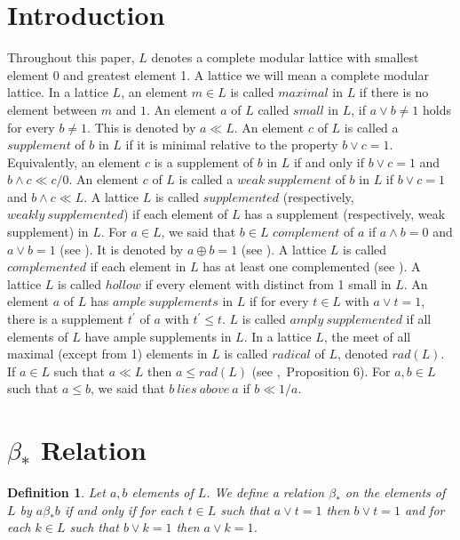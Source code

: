 \documentclass[a4paper,12pt]{article}
\newtheorem{definition}[theorem]{Definition}
\numberwithin{equation}{section}
\newcommand{\mycite}[2]{\textnormal{\cite{#1},~#2}}
\begin{document}
\section{Introduction}
Throughout this paper, $ L $ denotes a complete modular lattice with smallest element 0 and 
greatest element 1. A lattice we will mean a complete modular lattice. In a lattice $ L $, an element $ m \in L $ is called $ maximal $ in $ L $ if there is no element between $ m $ and $ 1 $. An element $ a $ of $ L $ 
called $ small $ in $ L $, if $ a \vee b \neq 1 $ holds for every $ b \neq 1 $. This is denoted by $ a \ll L $. An element $ c $ of $ L $ is called a $ supplement $ of $ b $ in $ L $ 
if it is minimal relative to the property $ b \vee c = 1 $. Equivalently, an element $ c $ is a supplement of $ b $ in $ L $ if and only if $ b \vee c = 1 $ and 
$ b \wedge c \ll c/0 $. An element $ c $ of $ L $ is called a $ weak \ supplement $ of $ b $ in $ L $ if $ b \vee c = 1 $ and $ b \wedge c \ll L $. A lattice $ L $ is called 
$ supplemented $ (respectively, $ weakly \ supplemented $) if each element of $ L $ has a supplement (respectively, weak supplement) in $ L $.
For $ a \in L $, we said that $ b \in L $ $ complement $ of $ a $ if $ a \wedge b = 0 $ and $ a \vee b = 1 $ (see \cite{davey}). It is denoted by $ a \oplus b = 1 $ (see \cite{calugeranu}). 
A lattice $ L $ is called $ complemented $ if each element in $ L $ has at least one complemented (see \cite{calugeranu}). A lattice $ L $ is called $ hollow $ if every element with distinct from 
1 small in $ L $. An element $ a $ of $ L $ has $ ample \  supplements $ in $ L $ if for every $ t \in L $ with  $ a \vee t = 1 $, there is a supplement $ t^{'} $ of $ a $ with $ t^{'} \leq t $. 
$ L $ is called $ amply \ supplemented $ if all elements of $ L $ have ample supplements in $ L $. 
In a lattice $ L $, the meet of all maximal (except from 1) elements in $ L $ is called $ radical $ of $ L $, denoted $rad(L) $.  
If $ a \in L $ such that $ a \ll L $ then $ a \leq rad(L) $ (see \mycite{stenstrom}{Proposition 6}). 
For $ a,b \in L $ such that $ a \leq b $, we said that $ b \ lies \ above \ a $ if $ b \ll 1/a $.
\section{$ \beta_* $ Relation}
\begin{definition} \label{1}
  Let $ a,b $ elements of $ L $. We define a relation $ \beta_* $ on the elements of $ L $ by 
  $ a \beta_* b $ if and only if for each $ t \in L $ such that $ a \vee t = 1 $ then $ b \vee t = 1 $ and for each 
  $ k \in L $ such that $ b \vee k = 1 $ then $ a \vee k = 1 $. 

\end{definition}
\end{document}
